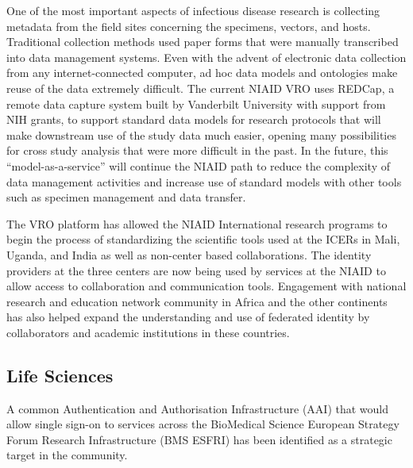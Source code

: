 \documentclass[fleqn,10pt]{wlscirep}
\begin{document}
{One of the most important aspects of infectious disease research is collecting metadata from the field sites concerning the specimens, vectors, and hosts.  Traditional collection methods used paper forms that were manually transcribed into data management systems.  Even with the advent of electronic data collection from any internet-connected computer, ad hoc data models and ontologies make reuse of the data extremely difficult.  The current NIAID VRO uses REDCap, a remote data capture system built by Vanderbilt University with support from NIH grants, to support standard data models for research protocols that will make downstream use of the study data much easier, opening many possibilities for cross study analysis that were more difficult in the past.  In the future, this “model-as-a-service” will continue the NIAID path to reduce the complexity of data management activities and increase use of standard models with other tools such as specimen management and data transfer.

The VRO platform has allowed the NIAID International research programs to begin the process of standardizing the scientific tools used at the ICERs in Mali, Uganda, and India as well as non-center based collaborations.  The identity providers at the three centers are now being used by services at the NIAID to allow access to collaboration and communication tools.  Engagement with national research and education network community in Africa and the other continents has also helped expand the understanding and use of federated identity by collaborators and academic institutions in these countries.


\subsection{Life Sciences}
A common Authentication and Authorisation Infrastructure (AAI) that would allow single sign-on to services across the BioMedical Science European Strategy Forum Research Infrastructure (BMS ESFRI) has been identified as a strategic target in the community.

}
\end{document}
